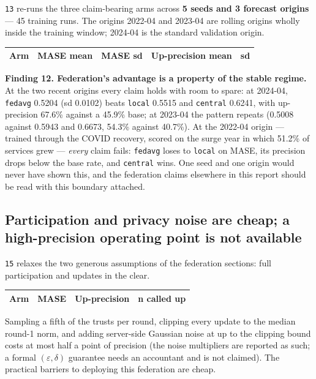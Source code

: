\documentclass[11pt,a4paper]{article}
\newcommand{\keypoint}[1]{%
  \par\vspace{0.4em}%
  \noindent\colorbox{fed!8}{\parbox{0.98\textwidth}{\vspace{0.2em}#1\vspace{0.2em}}}%
  \par\vspace{0.4em}}
\begin{document}
\texttt{13} re-runs the three claim-bearing arms across \textbf{5 seeds and 3 forecast origins}
--- 45 training runs. The origins 2022-04 and 2023-04 are rolling origins wholly inside the
training window; 2024-04 is the standard validation origin.

\begin{center}
\footnotesize
\begin{tabular}{@{}lrrrr@{}}
\toprule
\textbf{Arm} & \textbf{MASE mean} & \textbf{MASE sd} & \textbf{Up-precision mean} & \textbf{sd} \\
\bottomrule
\end{tabular}
\end{center}

\keypoint{\textbf{Finding 12. Federation's advantage is a property of the stable regime.} At the
two recent origins every claim holds with room to spare: at 2024-04, \texttt{fedavg} 0.5204
(sd 0.0102) beats \texttt{local} 0.5515 and \texttt{central} 0.6241, with up-precision 67.6\%
against a 45.9\% base; at 2023-04 the pattern repeats (0.5008 against 0.5943 and 0.6673, 54.3\%
against 40.7\%). At the 2022-04 origin --- trained through the COVID recovery, scored on the surge
year in which 51.2\% of services grew --- \emph{every} claim fails: \texttt{fedavg} loses to
\texttt{local} on MASE, its precision drops below the base rate, and \texttt{central} wins. One
seed and one origin would never have shown this, and the federation claims elsewhere in this
report should be read with this boundary attached.}

\subsection{Participation and privacy noise are cheap; a high-precision operating point is not
available}

\texttt{15} relaxes the two generous assumptions of the federation sections: full participation
and updates in the clear.

\begin{center}
\begin{tabular}{@{}lrrr@{}}
\toprule
\textbf{Arm} & \textbf{MASE} & \textbf{Up-precision} & \textbf{n called up} \\
\midrule
\bottomrule
\end{tabular}
\end{center}

Sampling a fifth of the trusts per round, clipping every update to the median round-1 norm, and
adding server-side Gaussian noise at up to the clipping bound costs at most half a point of
precision (the noise multipliers are reported as such; a formal $(\varepsilon,\delta)$ guarantee
needs an accountant and is not claimed). The practical barriers to deploying this federation are
cheap.
\end{document}
